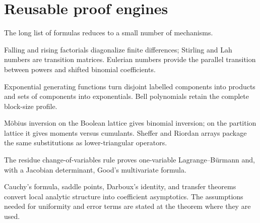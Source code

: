 \documentclass[11pt,a4paper,oneside,openany]{book}
\theoremstyle{definition}
\theoremstyle{remark}
\begin{document}
\section{Reusable proof engines}
The long list of formulas reduces to a small number of mechanisms.
\begin{description}[leftmargin=34mm,style=nextline]
\item[Change of polynomial basis]
Falling and rising factorials diagonalize finite differences; Stirling and Lah
numbers are transition matrices.  Eulerian numbers provide the parallel transition
between powers and shifted binomial coefficients.

\item[Labelled decomposition]
Exponential generating functions turn disjoint labelled components into products
and sets of components into exponentials.  Bell polynomials retain the complete
block-size profile.

\item[Incidence inversion]
M\"obius inversion on the Boolean lattice gives binomial inversion; on the partition
lattice it gives moments versus cumulants.  Sheffer and Riordan arrays package the
same substitutions as lower-triangular operators.

\item[Formal residues]
The residue change-of-variables rule proves one-variable Lagrange--B\"urmann and,
with a Jacobian determinant, Good's multivariate formula.

\item[Singularity localization]
Cauchy's formula, saddle points, Darboux's identity, and transfer theorems convert
local analytic structure into coefficient asymptotics.  The assumptions needed for
uniformity and error terms are stated at the theorem where they are used.
\end{description}
\end{document}
